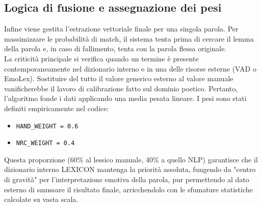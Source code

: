 \subsection{Logica di fusione e assegnazione dei pesi}
Infine viene gestita l'estrazione vettoriale finale per una singola parola. Per massimizzare le probabilità di match, il sistema tenta prima di cercare 
il lemma della parola e, in caso di fallimento, tenta con la parola flessa originale.\\
La criticità principale si verifica quando un termine è presente contemporaneamente nel dizionario interno e in una delle risorse esterne (VAD o EmoLex). 
Sostituire del tutto il valore generico esterno al valore manuale vanificherebbe il lavoro di calibrazione fatto sul dominio poetico. Pertanto, l'algoritmo 
fonde i dati applicando una media pesata lineare. I pesi sono stati definiti empiricamente nel codice:
\begin{itemize}
    \item \texttt{HAND\_WEIGHT = 0.6}
    \item \texttt{NRC\_WEIGHT = 0.4}
\end{itemize}
Questa proporzione (60\% al lessico manuale, 40\% a quello NLP) garantisce che il dizionario interno LEXICON mantenga la priorità assoluta, 
fungendo da "centro di gravità" per l'interpretazione emotiva della parola, pur permettendo al dato esterno di smussare il risultato finale, 
arricchendolo con le sfumature statistiche calcolate su vasta scala.


